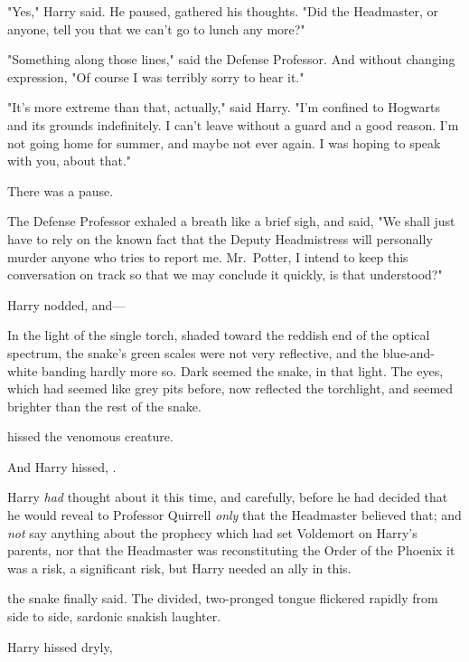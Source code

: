 "Yes," Harry said. He paused, gathered his thoughts. "Did the Headmaster, or
anyone, tell you that we can't go to lunch any more?"

"Something along those lines," said the Defense Professor. And without changing
expression, "Of course I was terribly sorry to hear it."

"It's more extreme than that, actually," said Harry. "I'm confined to Hogwarts
and its grounds indefinitely. I can't leave without a guard and a good reason.
I'm not going home for summer, and maybe not ever again. I was hoping{\el}
to speak with you, about that."

There was a pause.

The Defense Professor exhaled a breath like a brief sigh, and said, "We shall
just have to rely on the known fact that the Deputy Headmistress will
personally murder anyone who tries to report me. Mr.~Potter, I intend to keep
this conversation on track so that we may conclude it quickly, is that
understood?"

Harry nodded, and---

In the light of the single torch, shaded toward the reddish end of the optical
spectrum, the snake's green scales were not very reflective, and the
blue-and-white banding hardly more so. Dark seemed the snake, in that light.
The eyes, which had seemed like grey pits before, now reflected the torchlight,
and seemed brighter than the rest of the snake.

 hissed the venomous creature. 

And Harry hissed, .

Harry \emph{had} thought about it this time, and carefully, before he had
decided that he would reveal to Professor Quirrell \emph{only} that the
Headmaster believed that; and \emph{not} say anything about the prophecy which
had set Voldemort on Harry's parents, nor that the Headmaster was
reconstituting the Order of the Phoenix{\el} it was a risk, a significant
risk, but Harry needed an ally in this.

 the snake finally said. The divided,
two-pronged tongue flickered rapidly from side to side, sardonic snakish
laughter. 

 Harry hissed dryly, 

